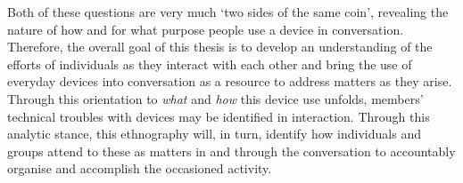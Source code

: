 \begin{revisedsubmission}
\noindent{}Both of these questions are very much `two sides of the same coin', revealing the nature of how and for what purpose people use a device in conversation.
Therefore, the overall goal of this thesis is to develop an understanding of the efforts of individuals as they interact with each other and bring the use of everyday devices into conversation as a resource to address matters as they arise.
Through this orientation to \textit{what} and \textit{how} this device use unfolds, members' technical troubles with devices may be identified in interaction.
Through this analytic stance, this ethnography will, in turn, identify how individuals and groups attend to these as matters in and through the conversation to accountably organise and accomplish the occasioned activity.

\end{revisedsubmission}








